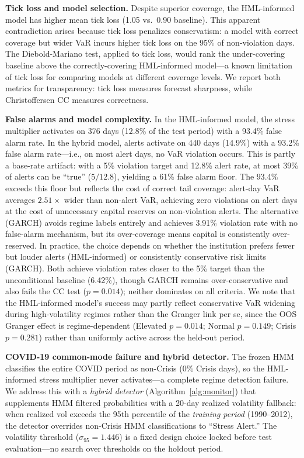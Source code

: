 \documentclass[sigconf,anonymous]{acmart}
\begin{document}
\textbf{Tick loss and model selection.}
Despite superior coverage, the HML-informed model has higher mean tick loss
(1.05 vs.\ 0.90 baseline). This apparent contradiction arises because tick loss
penalizes conservatism: a model with correct coverage but wider VaR incurs higher
tick loss on the 95\% of non-violation days. The Diebold-Mariano test, applied to
tick loss, would rank the under-covering baseline above the correctly-covering
HML-informed model---a known limitation of tick loss for comparing models at
different coverage levels. We report both metrics for transparency: tick loss
measures forecast sharpness, while Christoffersen CC measures correctness.

\textbf{False alarms and model complexity.}
In the HML-informed model, the stress multiplier activates on 376 days
(12.8\% of the test period) with a 93.4\% false alarm rate. In the hybrid model,
alerts activate on 440 days (14.9\%) with a 93.2\% false alarm rate---i.e., on
most alert days, no VaR violation occurs.
This is partly a base-rate artifact: with a 5\% violation target and 12.8\%
alert rate, at most 39\% of alerts can be ``true'' ($5/12.8$), yielding a
61\% false alarm floor. The 93.4\% exceeds this floor but reflects the cost
of correct tail coverage: alert-day VaR averages $2.51\times$ wider than
non-alert VaR, achieving zero violations on alert days at the cost of
unnecessary capital reserves on non-violation alerts.
The alternative (GARCH) avoids regime labels entirely and achieves
3.91\% violation rate with no false-alarm mechanism, but its over-coverage means
capital is consistently over-reserved. In practice, the choice depends on whether
the institution prefers fewer but louder alerts (HML-informed) or consistently
conservative risk limits (GARCH). Both achieve violation rates closer to the 5\%
target than the unconditional baseline (6.42\%), though GARCH remains
over-conservative and also fails the CC test ($p = 0.014$); neither
dominates on all criteria.
We note that the HML-informed model's success may partly reflect conservative
VaR widening during high-volatility regimes rather than the Granger link per se,
since the OOS Granger effect is regime-dependent
(Elevated $p = 0.014$; Normal $p = 0.149$; Crisis $p = 0.281$)
rather than uniformly active across the held-out period.

\textbf{COVID-19 common-mode failure and hybrid detector.}
The frozen HMM classifies the entire COVID period as non-Crisis (0\% Crisis days),
so the HML-informed stress multiplier never activates---a complete regime detection
failure. We address this with a \emph{hybrid detector} (Algorithm~\ref{alg:monitor})
that supplements HMM filtered probabilities with a 20-day realized volatility
fallback: when realized vol exceeds the 95th percentile of the \emph{training period}
(1990--2012), the detector overrides non-Crisis HMM classifications to ``Stress Alert.''
The volatility threshold ($\sigma_{95} = 1.446$) is a fixed design choice locked
before test evaluation---no search over thresholds on the holdout period.
\end{document}
